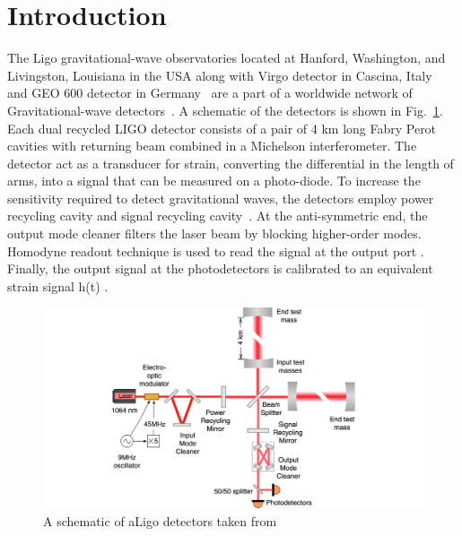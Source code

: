 \documentclass[12pt]{iopart}
\begin{document}
%
%



\section{Introduction}\label{introduction}

The Ligo  gravitational-wave observatories located at Hanford, Washington, and Livingston, Louisiana in the USA along with Virgo detector in Cascina, Italy~\cite{virgo} and GEO 600 detector in Germany~\cite{german} are a part of a worldwide network of Gravitational-wave detectors~\cite{aligo}. 
A schematic of the detectors is shown in Fig.~\ref{fig:schematic}.
Each dual recycled LIGO detector consists of a pair of 4 km long Fabry Perot cavities with returning beam combined in a Michelson interferometer. The detector act as a transducer for strain, converting the differential in the length of arms, into a signal that can be measured on a photo-diode. To increase the sensitivity required to detect gravitational waves, the detectors employ power recycling cavity and signal recycling cavity~\cite{signalr}. At the anti-symmetric end, the output mode cleaner filters the laser beam by blocking higher-order modes. Homodyne readout technique is used to read the signal at the output port \cite{Fricke_2012}. Finally, the output signal at the photodetectors is calibrated to an equivalent strain signal h(t) \cite{Abbott_2017,Viets_2018}.
\begin{figure}[h]
    \centering
    \includegraphics[width=12cm]{ligo-schematic.png}
    \caption{A schematic of aLigo detectors taken from {~\cite{schematic}} }
    \label{fig:schematic}
\end{figure}
\end{document}
